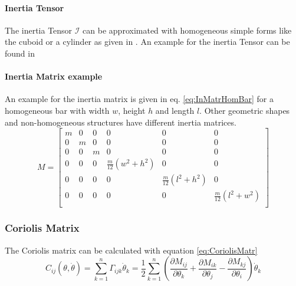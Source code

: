 \paragraph{Inertia Tensor}
The inertia Tensor
 $\mathcal{I}$ 
can be approximated with homogeneous simple forms like the cuboid or a cylinder as given in \cite{PhysScientEng}. 
An example for the inertia Tensor can be found in \cite{MathIntroRobManip} 

\paragraph{Inertia Matrix example}
An example for the inertia matrix is given in eq. \ref{eq:InMatrHomBar} for a homogeneous bar with width $w$, height $h$ and length $l$. Other geometric shapes and non-homogeneous structures have different inertia matrices. 
\begin{equation} \label{eq:InMatrHomBar}
	M=
	\begin{bmatrix}
	m & 0 & 0 & 0 & 0 & 0\\
	0 & m & 0 & 0 & 0 & 0\\
	0 & 0 & m & 0 & 0 & 0\\
	0 & 0 & 0 & \frac{m}{12}(w^2 + h^2) & 0 & 0\\
	0 & 0 & 0 & 0 & \frac{m}{12}(l^2+h^2) & 0\\
	0 & 0 & 0 & 0 & 0 & \frac{m}{12}(l^2 +w^2)\\
	\end{bmatrix}
\end{equation}


%
%	


\subsubsection{Coriolis Matrix }
The Coriolis matrix can be calculated with equation \ref{eq:CoriolisMatr}
\begin{equation}\label{eq:CoriolisMatr}
	C_{ij}(\theta,\dot{\theta}) = \sum_{k=1}^{n} \Gamma_{ijk}\dot{\theta}_k=\frac{1}{2} \sum_{k=1}^{n} (\frac{\partial M_{ij}}{\partial\theta_k}+\frac{\partial M_{ik}}{\partial\theta_j}-\frac{\partial M_{kj}}{\partial\theta_i})\dot{\theta}_k
\end{equation}

